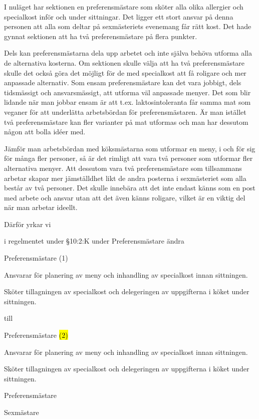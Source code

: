 \documentclass[../_main/handlingar.tex]{subfiles}
\begin{document}

I nuläget har sektionen en preferensmästare som sköter alla olika allergier och specialkost inför och under sittningar. Det ligger ett stort ansvar på denna personen att alla som deltar på sexmästeriets evenemang får rätt kost. Det hade gynnat sektionen att ha två preferensmästare på flera punkter. 

Dels kan preferensmästarna dela upp arbetet och inte själva behöva utforma alla de alternativa kosterna. Om sektionen skulle välja att ha två preferensmästare skulle det också göra det möjligt för de med specialkost att få roligare och mer anpassade alternativ. Som ensam preferensmästare kan det vara jobbigt, dels tidsmässigt och ansvarsmässigt, att utforma väl anpassade menyer. Det som blir lidande när man jobbar ensam är att t.ex. laktosintoleranta får samma mat som veganer för att underlätta arbetsbördan för preferensmästaren. Är man istället två preferensmästare kan fler varianter på mat utformas och man har dessutom någon att bolla idéer med. 

Jämför man arbetsbördan med köksmästarna som utformar en meny, i och för sig för många fler personer, så är det rimligt att vara två personer som utformar fler alternativa menyer. Att dessutom vara två preferensmästare som tillsammans arbetar skapar mer jämställdhet likt de andra posterna i sexmästeriet som alla består av två personer. Det skulle innebära att det inte endast känns som en post med arbete och ansvar utan att det även känns roligare, vilket är en viktig del när man arbetar ideellt.


Därför yrkar vi
\begin{attsatser}

    \att i regelmentet under \S10:2:K under Preferensmästare ändra \par
    \begin{emptylist}
        \item Preferensmästare (1)
        \begin{dashlist}
            \item Ansvarar för planering av meny och inhandling av specialkost innan sittningen.
            \item Sköter tillagningen av specialkost och delegeringen av uppgifterna i köket under sittningen.
        \end{dashlist}
    \end{emptylist}

    till 

    \begin{emptylist}
        \item Preferensmästare \hl{(2)}
        \begin{dashlist}
            \item Ansvarar för planering av meny och inhandling av specialkost innan sittningen.
            \item Sköter tillagningen av specialkost och delegeringen av uppgifterna i köket under sittningen.
        \end{dashlist}
        \changenote
    \end{emptylist}

\end{attsatser}

\changenote

\begin{signatures}{2}
    \isekt
    \signature{Silke Kylberg}{Preferensmästare}
    \signature{\sexm}{Sexmästare}
\end{signatures}
\end{document}
